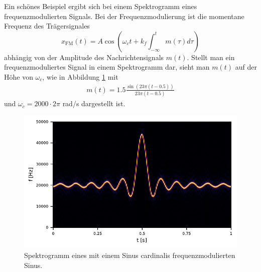 Ein schönes Beispiel ergibt sich bei einem Spektrogramm eines frequenzmodulierten 
Signals.
Bei der Frequenzmodulierung \cite{sonogramm:NAT} ist die momentane Frequenz des Trägersignales 
\begin{equation}
    x_{\text{FM}}(t) = A \cos\left( \omega_c t + k_f \int_{-\infty}^{t} m(\tau) d\tau\right)
\end{equation}
abhängig von der Amplitude des Nachrichtensignals $m(t)$.
Stellt man ein frequenzmoduliertes Signal in einem Spektrogramm dar,
sieht man $m(t)$ auf der Höhe von $\omega_c$, wie in Abbildung \ref{sonogramm:fmsono} mit 
\begin{align}
    m(t) = 1.5 \frac{\sin(23 \pi (t-0.5))}{23 \pi (t-0.5)}
\end{align}
und $\omega_c =2000\cdot 2\pi$ rad/s dargestellt ist.
\begin{figure}
    \centering
    \includegraphics{papers/sonogramm/images/fm_sono_windows.pdf}
    \caption{Spektrogramm eines mit einem Sinus cardinalis frequenzmodulierten Sinus.
%
    \label{sonogramm:fmsono}
    }
\end{figure}
